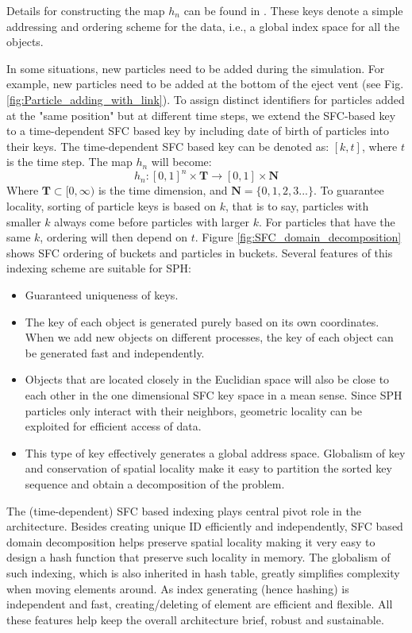 Details for constructing the map $h_n$ can be found in \citep{patra1995problem}. These keys denote a simple addressing and ordering scheme for the data, i.e., a global index space for all the objects.

In some situations, new particles need to be added during the simulation. For example, new particles need to be added at the bottom of the eject vent (see Fig. \ref{fig:Particle_adding_with_link}). To assign distinct identifiers for particles added at the "same position" but at different time steps, we extend the SFC-based key to a time-dependent SFC based key by including date of birth of particles into their keys. The time-dependent SFC based key can be denoted as: $[k,t]$, where $t$ is the time step. The map $h_n$ will become:
\begin{equation}
h_n: [0,1]^n \times \textbf{T} \rightarrow [0,1] \times \textbf{N}
\end{equation}
Where $\textbf{T} \subset [0,\infty)$ is the time dimension, and $\textbf{N}=\lbrace 0, 1, 2, 3...\rbrace$.
To guarantee locality, sorting of particle keys is based on $k$, that is to say, particles with smaller $k$ always come before particles with larger $k$. For particles that have the same $k$, ordering will then depend on $t$. Figure \ref{fig:SFC_domain_decomposition} shows SFC ordering of buckets and particles in buckets. 
Several features of this indexing scheme are suitable for SPH:
\begin{itemize}
\item Guaranteed uniqueness of keys.
\item The key of each object is generated purely based on its own coordinates. When we add new objects on different processes, the key of each object can be generated fast and independently.
\item Objects that are located closely in the Euclidian space will also be close to each other in the one dimensional SFC key space in a mean sense. Since SPH particles only interact with their neighbors, geometric locality can be exploited for efficient access of data.
\item This type of key effectively generates a global address space. Globalism of key and conservation of spatial locality make it easy to partition the sorted key sequence and obtain a decomposition of the problem.
\end{itemize}

The (time-dependent) SFC based indexing plays central pivot role in the architecture. Besides creating unique ID efficiently and independently, SFC based domain decomposition helps preserve spatial locality making it very easy to design a hash function that preserve such locality in memory. The globalism of such indexing, which is also inherited in hash table, greatly simplifies complexity when moving elements around. As index generating (hence hashing) is independent and fast, creating/deleting of element are efficient and flexible.
All these features help keep the overall architecture brief, robust and sustainable.

